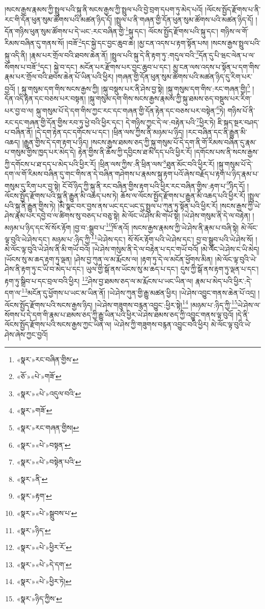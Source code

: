 །སངས་རྒྱས་རྣམས་ཀྱི་སྤྲུལ་པའི་སྐུ་ནི་སངས་རྒྱས་ཀྱི་སྤྲུལ་པའི་བྱེ་བྲག་དཔག་ཏུ་མེད་པའོ། །ལོངས་སྤྱོད་རྫོགས་པ་ནི་རང་གི་དོན་ཕུན་སུམ་ཚོགས་པའི་མཚན་ཉིད་དོ། །སྤྲུལ་པ་ནི་གཞན་གྱི་དོན་ཕུན་སུམ་ཚོགས་པའི་མཚན་ཉིད་དོ། །དོན་གཉིས་ཕུན་སུམ་ཚོགས་པ་དེ་ཡང་:རང་བཞིན་གྱི་\footnote{«སྣར་»རང་བཞིན་གྱིས་}སྐུ་དང་། ལོངས་སྤྱོད་རྫོགས་པའི་སྐུ་དང་། གཉིས་ལ་གོ་རིམས་བཞིན་དུ་གནས་སོ། །བཟོ་\footnote{«ཅོ་»«པེ་»གཟོ་}དང་སྐྱེ་དང་བྱང་ཆུབ་ཆེ། །མྱ་ངན་འདས་པ་རྟག་སྟོན་པས། །སངས་རྒྱས་སྤྲུལ་པའི་སྐུ་འདི་ནི། །རྣམ་པར་གྲོལ་བའི་ཐབས་ཆེན་ནོ། །སྤྲུལ་པའི་སྐུ་དེ་ནི་རྟག་ཏུ་:གདུལ་བའི་\footnote{«སྣར་»«པེ་»འདུལ་བའི་}དོན་དུ་པི་ཝང་ལེན་པ་ལ་སོགས་པ་བཟོ་\footnote{«སྣར་»གཟོ་}དང་། སྐྱེ་བ་དང་། མངོན་པར་རྫོགས་པར་བྱང་ཆུབ་པ་དང་། མྱ་ངན་ལས་འདས་པ་སྟོན་པ་དག་གིས་རྣམ་པར་གྲོལ་བའི་ཐབས་ཆེན་པོ་ཡིན་པའི་ཕྱིར། །གཞན་གྱི་དོན་ཕུན་སུམ་ཚོགས་པའི་མཚན་ཉིད་དུ་རིག་པར་བྱའོ། །
སྐུ་གསུམ་དག་གིས་སངས་རྒྱས་ཀྱི། །སྐུ་བསྡུས་པར་ནི་ཤེས་བྱ་སྟེ། །སྐུ་གསུམ་དག་གིས་:རང་གཞན་གྱི།\footnote{«སྣར་»རང་གཞན་གྱིས།} །དོན་འདི་རྟེན་དང་བཅས་པར་བསྟན། །སྐུ་གསུམ་དག་གིས་སངས་རྒྱས་རྣམས་ཀྱི་སྐུ་ཐམས་ཅད་བསྡུས་པར་རིག་པར་བྱ་བ་ལ། སྐུ་གསུམ་པོ་དེ་དག་གིས་ཀྱང་རང་དང་གཞན་གྱི་དོན་རྟེན་དང་བཅས་པར་བསྟེན་\footnote{«སྣར་»«པེ་»བསྟན་}ཏེ། གཉིས་པོ་ནི་རང་དང་གཞན་གྱི་དོན་གྱིས་རབ་ཏུ་ཕྱེ་བའི་ཕྱིར་དང་། དེ་གཉིས་ཀྱང་དེ་ལ་:བརྟེན་པའི་\footnote{«སྣར་»«པེ་»བསྟེན་པའི་}ཕྱིར་ཏེ། ཇི་སྐད་སྔར་བཤད་པ་བཞིན་ནོ། །དེ་དག་རྟེན་དང་དགོངས་པ་དང་། །ཕྲིན་ལས་ཀྱིས་ནི་མཉམ་པ་ཉིད། །རང་བཞིན་དང་ནི་རྒྱུན་མི་འཆད། །རྒྱུན་གྱིས་དེ་དག་རྟག་པ་ཉིད། །སངས་རྒྱས་ཐམས་ཅད་ཀྱི་སྐུ་གསུམ་པོ་དེ་དག་ནི་གོ་རིམས་བཞིན་དུ་རྣམ་པ་གསུམ་གྱིས་ཁྱད་པར་མེད་དེ། རྟེན་གྱིས་ནི་ཆོས་ཀྱི་དབྱིངས་ཐ་མི་དད་པའི་ཕྱིར་རོ། །དགོངས་པས་ནི་སངས་རྒྱས་ཀྱི་དགོངས་པ་ཐ་དད་པ་མེད་པའི་ཕྱིར་རོ། །ཕྲིན་ལས་ཀྱིས་:ནི་ཕྲིན་ལས་\footnote{«སྣར་»ནི་}ཐུན་མོང་བའི་ཕྱིར་རོ། །སྐུ་གསུམ་པོ་དེ་དག་ལ་གོ་རིམས་བཞིན་དུ་གང་གིས་ན་དེ་བཞིན་གཤེགས་པ་རྣམས་སྐུ་རྟག་པའོ་ཞེས་བརྗོད་པ་རྟག་པ་ཉིད་རྣམ་པ་གསུམ་དུ་རིག་པར་བྱ་སྟེ། ངོ་བོ་ཉིད་ཀྱི་སྐུ་ནི་རང་བཞིན་གྱིས་རྟག་པའི་ཕྱིར་རང་བཞིན་གྱིས་:རྟག་པ་\footnote{«སྣར་»རྟག་}ཉིད་དོ། །ལོངས་སྤྱོད་རྫོགས་པའི་སྐུ་ནི་རྒྱུན་མི་འཆད་པས་ཏེ། ཆོས་ལ་ལོངས་སྤྱོད་རྫོགས་པ་རྒྱུན་མི་འཆད་པའི་ཕྱིར་རོ། །སྤྲུལ་པའི་སྐུ་ནི་རྒྱུན་གྱིས་ཏེ། །མི་སྣང་བར་བྱས་ནས་ཡང་དང་ཡང་དུ་སྤྲུལ་པ་ཀུན་ཏུ་སྟོན་པའི་ཕྱིར་རོ། །སངས་རྒྱས་ཀྱི་ཡེ་ཤེས་རྣམ་པར་དབྱེ་བ་ལ་ཚིགས་སུ་བཅད་པ་བཅུ་སྟེ། མེ་ལོང་ཡེ་ཤེས་མི་གཡོ་སྟེ། །ཡེ་ཤེས་གསུམ་ནི་དེ་ལ་བརྟེན། །མཉམ་པ་ཉིད་དང་སོ་སོར་རྟོག །བྱ་བ་:སྒྲུབ་པ་\footnote{«སྣར་»«པེ་»སྒྲུབས་པ་}ཁོ་ནའོ། །སངས་རྒྱས་རྣམས་ཀྱི་ཡེ་ཤེས་ནི་རྣམ་པ་བཞི་སྟེ། མེ་ལོང་ལྟ་བུའི་ཡེ་ཤེས་དང་། མཉམ་པ་:ཉིད་ཀྱི་\footnote{«སྣར་»ཉིད་}ཡེ་ཤེས་དང་། སོ་སོར་རྟོག་པའི་ཡེ་ཤེས་དང་། བྱ་བ་སྒྲུབ་པའི་ཡེ་ཤེས་སོ། །མེ་ལོང་ལྟ་བུའི་ཡེ་ཤེས་ནི་མི་གཡོ་བའོ། །ཡེ་ཤེས་གསུམ་ནི་དེ་ལ་བརྟེན་པ་དང་གཡོ་བའོ། །མེ་ལོང་ཡེ་ཤེས་ང་ཡི་མེད། །ཡོངས་སུ་མ་ཆད་རྟག་ཏུ་ལྡན། །ཤེས་བྱ་ཀུན་ལ་མ་རྨོངས་ལ། །རྟག་ཏུ་དེ་ལ་མངོན་ཕྱོགས་མིན། །མེ་ལོང་ལྟ་བུའི་ཡེ་ཤེས་ནི་རྟག་ཏུ་ང་ཡི་བ་མེད་པ་དང་། ཡུལ་གྱི་སྒོ་ནས་ཡོངས་སུ་མ་ཆད་པ་དང་། དུས་ཀྱི་སྒོ་ནས་རྟག་ཏུ་ལྡན་པ་དང་། རྟག་ཏུ་སྒྲིབ་པ་དང་བྲལ་བའི་ཕྱིར། \footnote{«སྣར་»«པེ་»ཕྱིར་རོ་}ཤེས་བྱ་ཐམས་ཅད་ལ་མ་རྨོངས་པ་ཡང་ཡིན་ལ། རྣམ་པ་མེད་པའི་ཕྱིར་:དེ་དག་ལ་\footnote{«སྣར་»«པེ་»དེ་དག་}མངོན་དུ་ཕྱོགས་པ་ཡང་མ་ཡིན་ནོ། །ཡེ་ཤེས་ཀུན་གྱི་རྒྱུ་མཚན་ཕྱིར། །ཡེ་ཤེས་འབྱུང་གནས་ཆེན་པོ་འདྲ། །ལོངས་སྤྱོད་རྫོགས་པའི་སངས་རྒྱས་ཉིད། །ཡེ་ཤེས་གཟུགས་བརྙན་འབྱུང་:ཕྱིར་སྟེ།\footnote{«སྣར་»«པེ་»ཕྱིར་ཏེ།} །མཉམ་པ་:ཉིད་ཀྱི་\footnote{«སྣར་»ཉིད་ཀྱིས་}ཡེ་ཤེས་ལ་སོགས་པ་དེ་དག་གི་རྣམ་པ་ཐམས་ཅད་ཀྱི་རྒྱུ་ཡིན་པའི་ཕྱིར་ཡེ་ཤེས་ཐམས་ཅད་ཀྱི་འབྱུང་གནས་ལྟ་བུའོ། །དེ་ནི་ལོངས་སྤྱོད་རྫོགས་པའི་སངས་རྒྱས་ཀྱང་ཡིན་ལ། ཡེ་ཤེས་ཀྱི་གཟུགས་བརྙན་འབྱུང་བའི་ཕྱིར། མེ་ལོང་ལྟ་བུའི་ཡེ་ཤེས་ཞེས་ཀྱང་བྱའོ། 